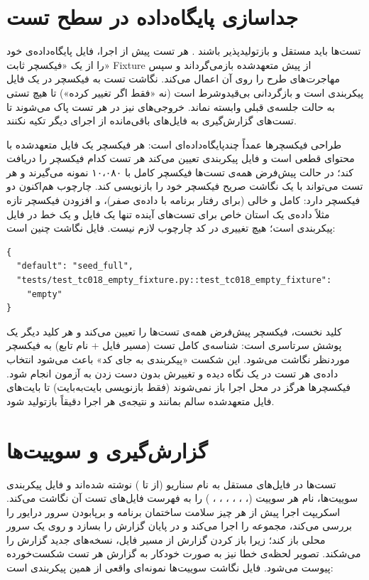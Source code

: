 \section{جداسازی پایگاه‌داده در سطح تست}
تست‌ها باید مستقل و بازتولیدپذیر باشند
\cite{meszaros2007}.
هر تست پیش از اجرا، فایل پایگاه‌داده‌ی خود را از یک «فیکسچر ثابت»
\gls{Fixture}
از پیش متعهدشده بازمی‌گرداند و سپس مهاجرت‌های طرح را روی آن اعمال می‌کند. نگاشت تست به فیکسچر در یک فایل پیکربندی است و بازگردانی بی‌قیدوشرط است (نه «فقط اگر تغییر کرده») تا هیچ تستی به حالت جلسه‌ی قبلی وابسته نماند. خروجی‌های
نیز در هر تست پاک می‌شوند تا تست‌های گزارش‌گیری به فایل‌های باقی‌مانده از اجرای دیگر تکیه نکنند.

طراحی فیکسچرها عمداً چندپایگاه‌داده‌ای است: هر فیکسچر یک فایل
متعهدشده با محتوای قطعی است و فایل پیکربندی
تعیین می‌کند هر تست کدام فیکسچر را دریافت کند؛ در حالت پیش‌فرض همه‌ی تست‌ها فیکسچر کامل با ۱۰،۰۸۰ نمونه می‌گیرند و هر تست می‌تواند با یک نگاشت صریح فیکسچر خود را بازنویسی کند. چارچوب هم‌اکنون دو فیکسچر دارد: کامل و خالی (برای رفتار برنامه با داده‌ی صفر)، و افزودن فیکسچر تازه \pdash{} مثلاً داده‌ی یک استان خاص برای تست‌های آینده \pdash{} تنها یک فایل
و یک خط در فایل پیکربندی است؛ هیچ تغییری در کد چارچوب لازم نیست. فایل نگاشت چنین است:

\begin{latin}
\begin{lstlisting}[numbers=none]
{
  "default": "seed_full",
  "tests/test_tc018_empty_fixture.py::test_tc018_empty_fixture":
    "empty"
}
\end{lstlisting}
\end{latin}

کلید نخست، فیکسچر پیش‌فرض همه‌ی تست‌ها را تعیین می‌کند و هر کلید دیگر یک پوشش سرتاسری است: شناسه‌ی کامل تست (مسیر فایل + نام تابع) به فیکسچر موردنظر نگاشت می‌شود. این شکست «پیکربندی به جای کد» باعث می‌شود انتخاب داده‌ی هر تست در یک نگاه دیده و تغییرش بدون دست زدن به آزمون انجام شود. فیکسچرها هرگز در محل اجرا باز نمی‌شوند (فقط بازنویسی بایت‌به‌بایت) تا بایت‌های فایل متعهدشده سالم بمانند و نتیجه‌ی هر اجرا دقیقاً بازتولید شود.

\section{گزارش‌گیری و سوییت‌ها}
تست‌ها در فایل‌های مستقل به نام سناریو (از
تا
)
نوشته شده‌اند و فایل پیکربندی سوییت‌ها، نام هر سوییت (، ، ، ، ، ، ) را به فهرست فایل‌های تست آن نگاشت می‌کند. اسکریپت اجرا پیش از هر چیز سلامت ساختمان برنامه و برپا‌بودن سرور درایور را بررسی می‌کند، مجموعه را اجرا می‌کند و در پایان گزارش
\cite{allure}
را بسازد و روی یک سرور محلی باز کند؛ زیرا باز کردن گزارش از مسیر فایل، نسخه‌های جدید گزارش را می‌شکند. تصویر لحظه‌ی خطا نیز به صورت خودکار به گزارش هر تست شکست‌خورده پیوست می‌شود. فایل نگاشت سوییت‌ها نمونه‌ای واقعی از همین پیکربندی است:

